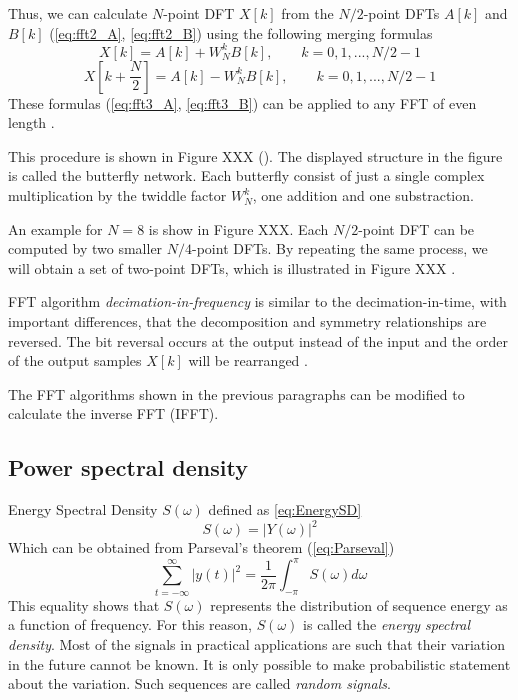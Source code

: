 \documentclass[twoside]{ctuthesis}
\theoremstyle{plain}
\theoremstyle{definition}
\theoremstyle{note}
\begin{document}
Thus, we can calculate $N$-point DFT $X[k]$ from the $N/2$-point DFTs $A[k]$ and $B[k]$ (\ref{eq:fft2_A}, \ref{eq:fft2_B}) using the following merging formulas
\begin{equation} \label{eq:fft3_A}
X[k]=A[k] + W^{k}_{N}B[k],\qquad k=0, 1, ..., N/2 -1
\end{equation}
\begin{equation} \label{eq:fft3_B}
X[k+\frac{N}{2}]=A[k] - W^{k}_{N}B[k],\qquad k=0, 1, ..., N/2 -1
\end{equation}
These formulas (\ref{eq:fft3_A}, \ref{eq:fft3_B}) can be applied to any FFT of even length \cite{cite:3}.

This procedure is shown in Figure XXX (\cite{cite:3}). The displayed structure in the figure is called the butterfly network. Each butterfly consist of just a single complex multiplication by the twiddle factor $W^{k}_{N}$, one addition and one substraction. 

An example for $N=8$ is show in Figure XXX. Each $N/2$-point DFT can be computed by two smaller $N/4$-point DFTs. By repeating the same process, we will obtain a set of two-point DFTs, which is illustrated in Figure XXX \cite{cite:RT_DSP}.

FFT algorithm \textit{decimation-in-frequency} is similar to the decimation-in-time, with important differences, that the decomposition and symmetry relationships are reversed. The bit reversal occurs at the output instead of the input and the order of the output samples $X[k]$ will be rearranged \cite{cite:RT_DSP}.

The FFT algorithms shown in the previous paragraphs can be modified to calculate the inverse FFT (IFFT).

\subsection{Power spectral density}
Energy Spectral Density $S(\omega)$ defined as \ref{eq:EnergySD}
\begin{equation} \label{eq:EnergySD}
S(\omega)=\left|Y(\omega)\right|^2
\end{equation}
Which can be obtained from Parseval's theorem (\ref{eq:Parseval})
\begin{equation} \label{eq:Parseval}
\sum_{t=-\infty}^{\infty}\left|y(t)\right|^2 = \frac{1}{2\pi}\int_{-\pi}^{\pi}S(\omega)d\omega
\end{equation}
This equality shows that $S(\omega)$ represents the distribution of sequence energy as a function of frequency. For this reason, $S(\omega)$ is called the \textit{energy spectral density}. 
Most of the signals in practical applications are such that their variation in the future cannot be known. It is only possible to make probabilistic statement about the variation. Such sequences are called \textit{random signals}. 
\end{document}
